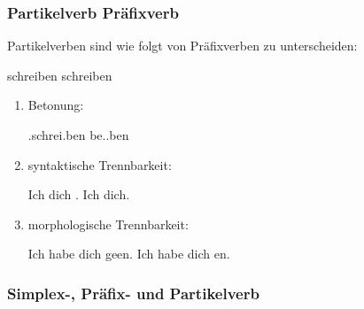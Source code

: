 \begin{frame}
\frametitle{Partikelverb \vs Präfixverb}

Partikelverben sind wie folgt von Präfixverben zu unterscheiden:

\ea  
\ea {}schreiben 
\ex {}schreiben
\z 
\z	
\begin{enumerate}
\item Betonung:

\ea \textipa{\textprimstress}.schrei.ben \vs be.\textipa{\textprimstress}.ben
\z

\item syntaktische Trennbarkeit:

\eal
\ex Ich  dich .
\ex Ich  dich.
\zl

\item morphologische Trennbarkeit:

\eal 
\ex Ich habe dich geen. 
\ex Ich habe dich en.
\zl

\end{enumerate}

\end{frame}


\subsubsection{Simplex-, Präfix- und  Partikelverb}

